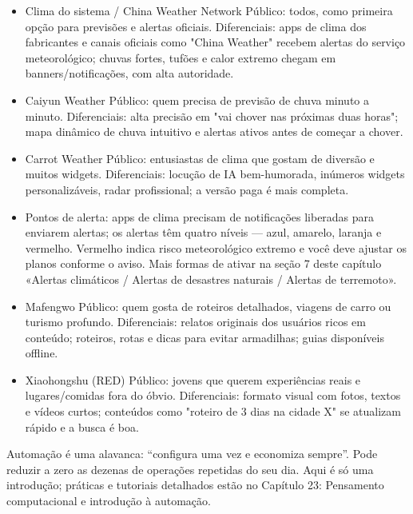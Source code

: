 \begin{itemize}
  \item Clima do sistema / China Weather Network Público: todos, como primeira opção para previsões e alertas oficiais. Diferenciais: apps de clima dos fabricantes e canais oficiais como "China Weather" recebem alertas do serviço meteorológico; chuvas fortes, tufões e calor extremo chegam em banners/notificações, com alta autoridade.
  \item Caiyun Weather Público: quem precisa de previsão de chuva minuto a minuto. Diferenciais: alta precisão em "vai chover nas próximas duas horas"; mapa dinâmico de chuva intuitivo e alertas ativos antes de começar a chover.
  \item Carrot Weather Público: entusiastas de clima que gostam de diversão e muitos widgets. Diferenciais: locução de IA bem-humorada, inúmeros widgets personalizáveis, radar profissional; a versão paga é mais completa.
  \item Pontos de alerta: apps de clima precisam de notificações liberadas para enviarem alertas; os alertas têm quatro níveis — azul, amarelo, laranja e vermelho. Vermelho indica risco meteorológico extremo e você deve ajustar os planos conforme o aviso. Mais formas de ativar na seção 7 deste capítulo «Alertas climáticos / Alertas de desastres naturais / Alertas de terremoto».
\end{itemize}


\begin{itemize}
  \item Mafengwo Público: quem gosta de roteiros detalhados, viagens de carro ou turismo profundo. Diferenciais: relatos originais dos usuários ricos em conteúdo; roteiros, rotas e dicas para evitar armadilhas; guias disponíveis offline.
  \item Xiaohongshu (RED) Público: jovens que querem experiências reais e lugares/comidas fora do óbvio. Diferenciais: formato visual com fotos, textos e vídeos curtos; conteúdos como "roteiro de 3 dias na cidade X" se atualizam rápido e a busca é boa.
\end{itemize}


Automação é uma alavanca: “configura uma vez e economiza sempre”. Pode reduzir a zero as dezenas de operações repetidas do seu dia. Aqui é só uma introdução; práticas e tutoriais detalhados estão no Capítulo 23: Pensamento computacional e introdução à automação.

